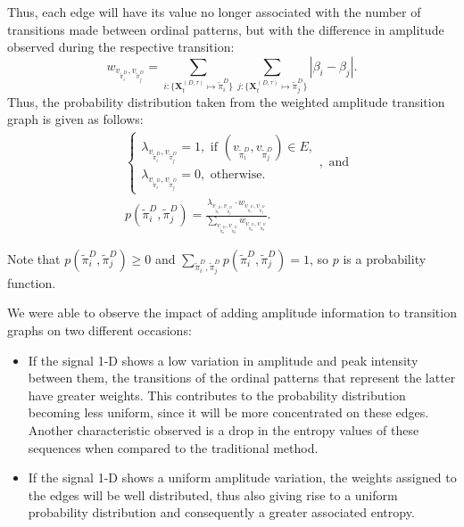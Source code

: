 Thus, each edge will have its value no longer associated with the number of transitions made between ordinal patterns, but with the difference in amplitude observed during the respective transition:
\begin{equation}
w_{v_{\widetilde \pi^D_i}, v_{\widetilde \pi^D_j}} =  \sum_{i : \{\mathbf{X}^{(D,\tau)}_t \mapsto \widetilde\pi^D_i\}} \sum_{j : \{\mathbf{X}^{(D,\tau)}_t \mapsto \widetilde\pi^D_j\}} |\beta_i - \beta_j| .
\end{equation}
Thus, the probability distribution taken from the weighted amplitude transition graph is given as follows:	
\begin{align}
&\left\{\begin{array}{l}
\lambda_{v_{\widetilde\pi^D_i}, v_{\widetilde\pi^D_j}} = 1, \text{ if } (v_{\widetilde\pi^D_i}, v_{\widetilde\pi^D_j}) \in {E}, \\
\lambda_{v_{\widetilde\pi^D_i}, v_{\widetilde\pi^D_j}} = 0, \text{ otherwise}.
\end{array}\right., \text{ and} \\
&p(\widetilde\pi^D_i, \widetilde\pi^D_j) = \frac{\lambda_{v_{\widetilde\pi^D_i}, v_{\widetilde\pi^D_j}} \cdot w_{v_{\widetilde\pi^D_i}, v_{\widetilde\pi^D_j}}}{\sum_{v_{\widetilde\pi^D_a}, v_{\widetilde\pi^D_b}} w_{v_{\widetilde\pi^D_a}, v_{\widetilde\pi^D_b}}}.
\end{align}

Note that  $p(\widetilde\pi^D_i, \widetilde\pi^D_j) \ge 0$ and $\sum_{\widetilde\pi^D_i, \widetilde\pi^D_j} p(\widetilde\pi^D_i, \widetilde\pi^D_j) = 1$, so $p$ is a probability function.

We were able to observe the impact of adding amplitude information to transition graphs on two different occasions:
\begin{itemize}
    \item If the signal \mbox{1-D} shows a low variation in amplitude and peak intensity between them, the transitions of the ordinal patterns that represent the latter have greater weights.
    This contributes to the probability distribution becoming less uniform, since it will be more concentrated on these edges.
    Another characteristic observed is a drop in the entropy values of these sequences when compared to the traditional method.
    \item If the signal \mbox{1-D} shows a uniform amplitude variation, the weights assigned to the edges will be well distributed, thus also giving rise to a uniform probability distribution and consequently a greater associated entropy.
\end{itemize}

